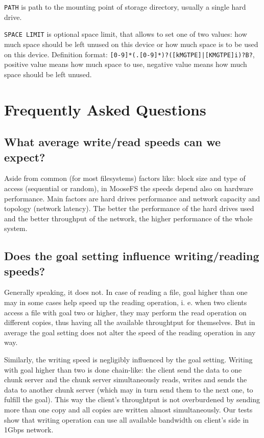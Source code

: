 \documentclass[a4paper,11pt,english]{report}
\def\code#1{\texttt{#1}}
\begin{document}
				\code{PATH} is path to the mounting point of storage directory, usually
				a single hard drive.

				\code{SPACE LIMIT} is optional space limit, that allows to set one of two
				values: how much space should be left unused on this device  or  how  much
				space   is   to   be   used   on   this   device.   Definition  format:
				\code{[0-9]*(.[0-9]*)?([kMGTPE]|[KMGTPE]i)?B?}, positive value means how  much
				space  to  use,  negative  value  means  how  much space should be left
				unused.

			

	\chapter{Frequently Asked Questions}
		\section{What average write/read speeds can we expect?}
		Aside from common (for most filesystems) factors like: block size and type of access (sequential or random), in MooseFS the speeds depend also on hardware performance. Main factors are hard drives performance and network capacity and topology (network latency). The better the performance of the hard drives used and the better throughput of the network, the higher performance of the whole system.

		\section{Does the goal setting influence writing/reading speeds?}
		Generally speaking, it does not. In case of reading a file, goal higher than one may in some cases help speed up the reading operation, i. e. when two clients access a file with goal two or higher, they may perform the read operation on different copies, thus having all the available throughtput for themselves. But in average the goal setting does not alter the speed of the reading operation in any way.
				
		Similarly, the writing speed is negligibly influenced by the goal setting. Writing with goal higher than two is done chain-like: the client send the data to one chunk server and the chunk server simultaneously reads, writes and sends the data to another chunk server (which may in turn send them to the next one, to fulfill the goal). This way the client's throughtput is not overburdened by sending more than one copy and all copies are written almost simultaneously. Our tests show that writing operation can use all available bandwidth on client's side in 1Gbps network.
		
\end{document}
